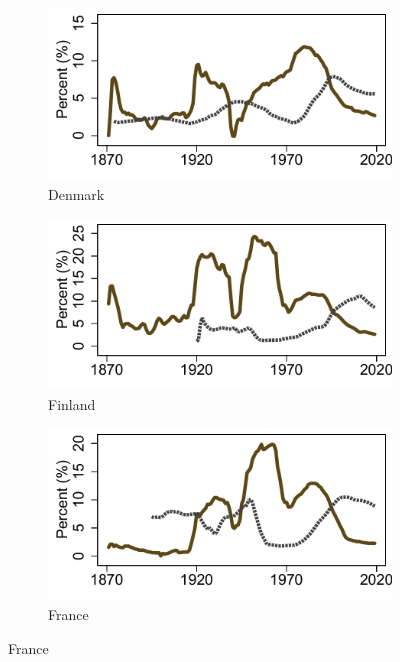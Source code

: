 \documentclass[12pt]{article}
\begin{document}
\begin{appendices}
\begin{singlespace}
\begin{figure}[ht]
\begin{subfigure}[b]{0.30\textwidth}
    \end{subfigure} 
    \begin{subfigure}[b]{0.30\textwidth}
    \caption*{Denmark}
    \includegraphics[width=\textwidth]{../Output/Figures/Median_dwn_unemp_Denmark.pdf}   
    \end{subfigure} 
    \begin{subfigure}[b]{0.30\textwidth}
    \caption*{Finland}
    \includegraphics[width=\textwidth]{../Output/Figures/Median_dwn_unemp_Finland.pdf}   
    \end{subfigure}
    \begin{subfigure}[b]{0.30\textwidth}
    \caption*{France}
    \includegraphics[width=\textwidth]{../Output/Figures/Median_dwn_unemp_France.pdf}   

\end{subfigure}
\end{figure}
\end{singlespace}
\end{appendices}
\end{document}
